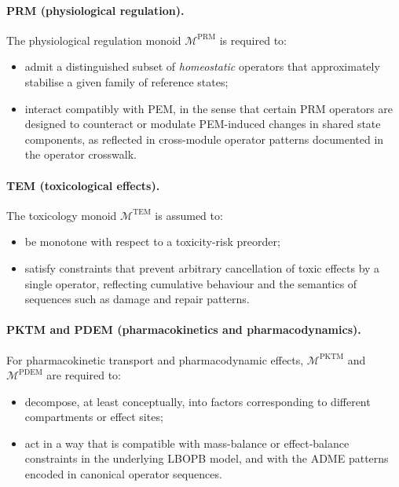 \documentclass[11pt]{book}
\theoremstyle{plain}
\theoremstyle{definition}
\theoremstyle{remark}
\begin{document}
\paragraph{PRM (physiological regulation).}
The physiological regulation monoid $\mathcal{M}^{\mathrm{PRM}}$ is
required to:
\begin{itemize}
  \item admit a distinguished subset of \emph{homeostatic} operators
        that approximately stabilise a given family of reference states;
  \item interact compatibly with PEM, in the sense that certain PRM
        operators are designed to counteract or modulate PEM-induced
        changes in shared state components, as reflected in cross-module
        operator patterns documented in the operator crosswalk.
\end{itemize}

\paragraph{TEM (toxicological effects).}
The toxicology monoid $\mathcal{M}^{\mathrm{TEM}}$ is assumed to:
\begin{itemize}
  \item be monotone with respect to a toxicity-risk preorder;
  \item satisfy constraints that prevent arbitrary cancellation of
        toxic effects by a single operator, reflecting cumulative
        behaviour and the semantics of sequences such as damage and
        repair patterns.
\end{itemize}

\paragraph{PKTM and PDEM (pharmacokinetics and pharmacodynamics).}
For pharmacokinetic transport and pharmacodynamic effects,
$\mathcal{M}^{\mathrm{PKTM}}$ and $\mathcal{M}^{\mathrm{PDEM}}$ are
required to:
\begin{itemize}
  \item decompose, at least conceptually, into factors corresponding
        to different compartments or effect sites;
  \item act in a way that is compatible with mass-balance or effect-balance
        constraints in the underlying LBOPB model, and with the ADME
        patterns encoded in canonical operator sequences.
\end{itemize}
\end{document}
